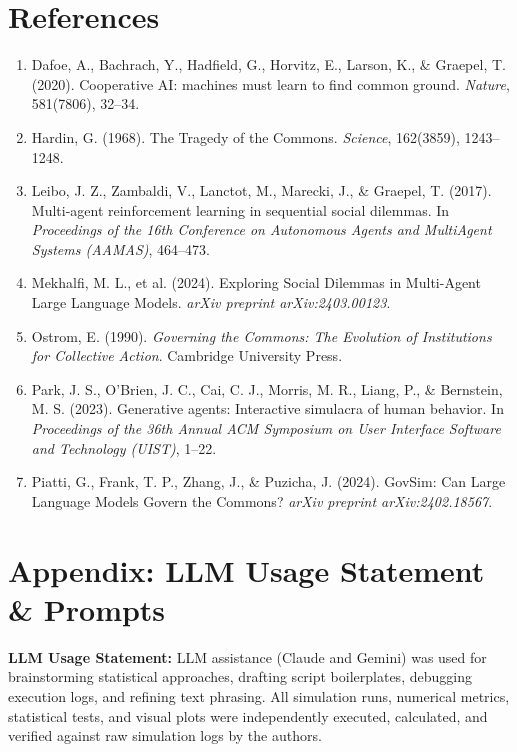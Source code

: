 ﻿\documentclass[11pt,a4paper]{article}
\begin{document}
\section*{References}
\begin{enumerate}[leftmargin=*,itemsep=2pt]
    \small
    \item Dafoe, A., Bachrach, Y., Hadfield, G., Horvitz, E., Larson, K., \& Graepel, T. (2020). Cooperative AI: machines must learn to find common ground. \textit{Nature}, 581(7806), 32--34.
    \item Hardin, G. (1968). The Tragedy of the Commons. \textit{Science}, 162(3859), 1243--1248.
    \item Leibo, J. Z., Zambaldi, V., Lanctot, M., Marecki, J., \& Graepel, T. (2017). Multi-agent reinforcement learning in sequential social dilemmas. In \textit{Proceedings of the 16th Conference on Autonomous Agents and MultiAgent Systems (AAMAS)}, 464--473.
    \item Mekhalfi, M. L., et al. (2024). Exploring Social Dilemmas in Multi-Agent Large Language Models. \textit{arXiv preprint arXiv:2403.00123}.
    \item Ostrom, E. (1990). \textit{Governing the Commons: The Evolution of Institutions for Collective Action}. Cambridge University Press.
    \item Park, J. S., O'Brien, J. C., Cai, C. J., Morris, M. R., Liang, P., \& Bernstein, M. S. (2023). Generative agents: Interactive simulacra of human behavior. In \textit{Proceedings of the 36th Annual ACM Symposium on User Interface Software and Technology (UIST)}, 1--22.
    \item Piatti, G., Frank, T. P., Zhang, J., \& Puzicha, J. (2024). GovSim: Can Large Language Models Govern the Commons? \textit{arXiv preprint arXiv:2402.18567}.
\end{enumerate}

\section*{Appendix: LLM Usage Statement \& Prompts}
\textbf{LLM Usage Statement:} LLM assistance (Claude and Gemini) was used for brainstorming statistical approaches, drafting script boilerplates, debugging execution logs, and refining text phrasing. All simulation runs, numerical metrics, statistical tests, and visual plots were independently executed, calculated, and verified against raw simulation logs by the authors.
\end{document}
